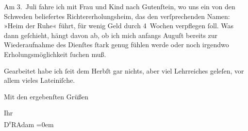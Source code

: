 \pstart
           Am 3. Juli fahre ich mit Frau und Kind nach Gutenſtein,
               wo uns ein von den Schweden beliefertes
               Richtererholungsheim, das den verſprechenden Namen: »Heim der Ruhe« führt, für wenig Geld durch 4 Wochen verpflegen ſoll. Was
               dann geſchieht, hängt davon ab, ob ich mich anfangs Auguſt bereits zur
               Wiederaufnahme des Dienſtes ſtark genug fühlen werde oder noch irgendwo
               Erholungsmöglichkeit ſuchen muß.\pend
           
\pstart
           Gearbeitet habe ich ſeit dem Herbſt gar nichts, aber viel
               Lehrreiches geleſen, vor allem vieles Lateiniſche.\pend
           
\pstart
           {\pb}Mit den ergebenſten Grüßen\pend
           
\pstart
           Ihr{\\[\baselineskip]}\spacefill\mbox{D\textsuperscript{r}RAdam}\pend
           \leftskip=0em{}\endnumbering{}  
      